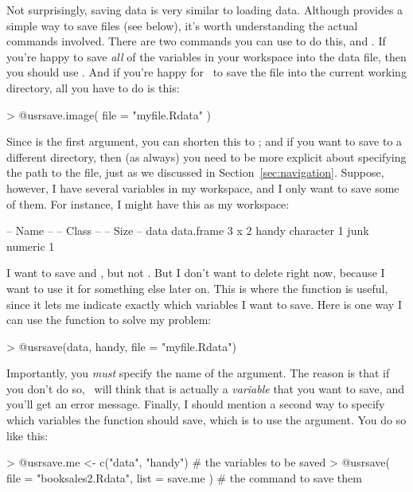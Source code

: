 Not surprisingly, saving data is very similar to loading data. Although \Rstudio provides a simple way to save files (see below), it's worth understanding the actual commands involved. There are two commands you can use to do this,  and . If you're happy to save {\it all} of the variables in your workspace into the data file, then you should use . And if you're happy for \R\ to save the file into the current working directory, all you have to do is this:
\begin{rblock1}
> @usr{save.image( file = "myfile.Rdata" )}
\end{rblock1}
Since  is the first argument, you can shorten this to ; and if you want to save to a different directory, then (as always) you need to be more explicit about specifying the path to the file, just as we discussed in Section~\ref{sec:navigation}. Suppose, however, I have several variables in my workspace, and I only want to save some of them. For instance, I might have this as my workspace:
\begin{rblock1}
   -- Name --   -- Class --   -- Size --
   data         data.frame    3 x 2     
   handy        character     1         
   junk         numeric       1        
\end{rblock1}
I want to save  and , but not . But I don't want to delete  right now, because I want to use it for something else later on. This is where the  function is useful, since it lets me indicate exactly which variables I want to save. Here is one way I can use the  function to solve my problem:
\begin{rblock1}
> @usr{save(data, handy, file = "myfile.Rdata")}
\end{rblock1}
Importantly, you {\it must} specify the name of the  argument. The reason is that if you don't do so, \R\ will think that  is actually a {\it variable} that you want to save, and you'll get an error message. Finally, I should mention a second way to specify which variables the  function should save, which is to use the  argument. You do so like this:
\begin{rblock1}
> @usr{save.me <- c("data", "handy")}   # the variables to be saved
> @usr{save( file = "booksales2.Rdata", list = save.me )}   # the command to save them
\end{rblock1}

